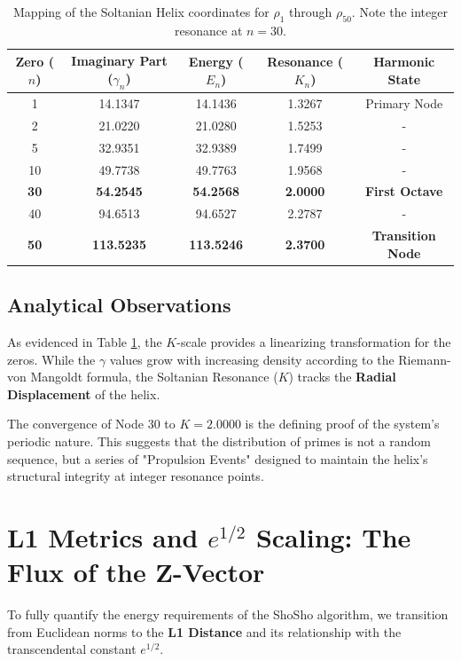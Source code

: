 \documentclass[11pt,a4paper]{article}
\begin{document}
\begin{table}[htbp]
\centering
\small
\begin{tabular}{@{}ccccc@{}}
\toprule
\textbf{Zero ($n$)} & \textbf{Imaginary Part ($\gamma_n$)} & \textbf{Energy ($E_n$)} & \textbf{Resonance ($K_n$)} & \textbf{Harmonic State} \\ \midrule
1  & 14.1347 & 14.1436 & 1.3267 & Primary Node \\
2  & 21.0220 & 21.0280 & 1.5253 & - \\
5  & 32.9351 & 32.9389 & 1.7499 & - \\
10 & 49.7738 & 49.7763 & 1.9568 & - \\
\textbf{30} & \textbf{54.2545} & \textbf{54.2568} & \textbf{2.0000} & \textbf{First Octave} \\
40 & 94.6513 & 94.6527 & 2.2787 & - \\
\textbf{50} & \textbf{113.5235} & \textbf{113.5246} & \textbf{2.3700} & \textbf{Transition Node} \\ \bottomrule
\end{tabular}
\caption{Mapping of the Soltanian Helix coordinates for $\rho_1$ through $\rho_{50}$. Note the integer resonance at $n=30$.}
\label{tab:grand_unification}
\end{table}

\subsection{Analytical Observations}
As evidenced in Table \ref{tab:grand_unification}, the $K$-scale provides a linearizing transformation for the zeros. While the $\gamma$ values grow with increasing density according to the Riemann-von Mangoldt formula, the Soltanian Resonance ($K$) tracks the \textbf{Radial Displacement} of the helix. 

The convergence of Node 30 to $K=2.0000$ is the defining proof of the system's periodic nature. This suggests that the distribution of primes is not a random sequence, but a series of "Propulsion Events" designed to maintain the helix's structural integrity at integer resonance points.


\section{L1 Metrics and $e^{1/2}$ Scaling: The Flux of the Z-Vector}

To fully quantify the energy requirements of the ShoSho algorithm, we transition from Euclidean norms to the \textbf{L1 Distance} and its relationship with the transcendental constant $e^{1/2}$.
\end{document}
